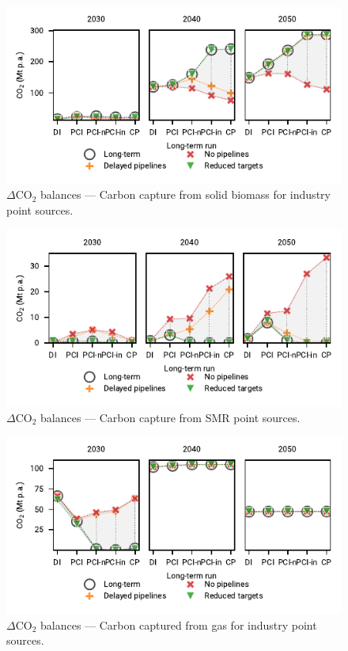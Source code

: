 \documentclass[pdflatex,sn-nature]{sn-jnl}%
\theoremstyle{thmstyleone}%
\theoremstyle{thmstyletwo}%
\theoremstyle{thmstylethree}%
\begin{document}
\begin{appendices}
\begin{figure}[htbp]
  \centering
  \includegraphics{figures/delta_balances_solid biomass for industry CC}
  \caption{$\Delta$CO$_2$ balances --- Carbon capture from solid biomass for industry point sources.}
  \label{fig:delta_balances_biomass_industry_cc}
\end{figure}

\begin{figure}[htbp]
  \centering
  \includegraphics{figures/delta_balances_SMR CC}
  \caption{$\Delta$CO$_2$ balances --- Carbon capture from SMR point sources.}
  \label{fig:delta_balances_smr_cc}
\end{figure}

\begin{figure}[htbp]
  \centering
  \includegraphics{figures/delta_balances_gas for industry CC}
  \caption{$\Delta$CO$_2$ balances --- Carbon captured from gas for industry point sources.}
  \label{fig:delta_balances_gas_for_industry}
\end{figure}


\end{appendices}
\end{document}
